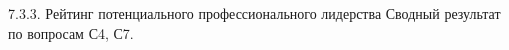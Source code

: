 \begin{frame}{7.3.3. Рейтинг потенциального профессионального лидерства}
\tiny 
Сводный результат по вопросам С4, С7.

\fontsize{5pt}{5}\selectfont
\begin{center}
\begin{tabular}{cllc}

\end{tabular}
\end{center}
\end{frame}


